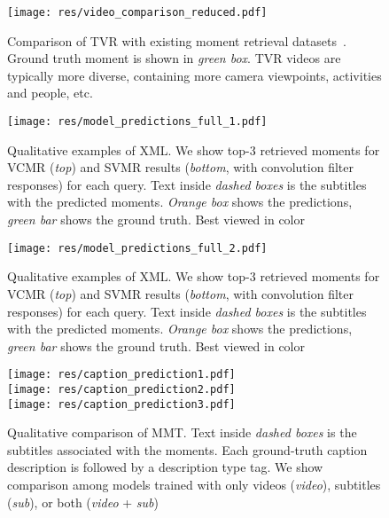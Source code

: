 \documentclass[runningheads]{llncs}
\begin{document}
\begin{figure}[!t]
  \centering
  \texttt{[image: res/video\_comparison\_reduced.pdf]}
  \caption{Comparison of TVR with existing moment retrieval datasets~\cite{regneri2013grounding,gao2017tall,Krishna2017DenseCaptioningEI,anne2017localizing}.
  Ground truth moment is shown in \textit{green box}. TVR videos are typically more diverse, containing more camera viewpoints, activities and people, etc.} 
  \label{fig:video_comparison}
\end{figure}


\begin{figure*}[!t]
  \centering
  \texttt{[image: res/model\_predictions\_full\_1.pdf]}
  \caption{Qualitative examples of XML. We show top-3 retrieved moments for VCMR (\textit{top}) and SVMR results (\textit{bottom}, with convolution filter responses) for each query. Text inside \textit{dashed boxes} is the subtitles with the predicted moments. \textit{Orange box} shows the predictions, \textit{green bar} shows the ground truth. Best viewed in color}
  \label{fig:tvr_model_predictions1}
\end{figure*}



\begin{figure*}[!t]
  \centering
  \texttt{[image: res/model\_predictions\_full\_2.pdf]}
  \caption{Qualitative examples of XML. We show top-3 retrieved moments for VCMR (\textit{top}) and SVMR results (\textit{bottom}, with convolution filter responses) for each query. Text inside \textit{dashed boxes} is the subtitles with the predicted moments. \textit{Orange box} shows the predictions, \textit{green bar} shows the ground truth. Best viewed in color}
  \label{fig:tvr_model_predictions2}
\end{figure*}


\begin{figure*}[!t]
  \centering
  \texttt{[image: res/caption\_prediction1.pdf]} \\
  \texttt{[image: res/caption\_prediction2.pdf]} \\
  \texttt{[image: res/caption\_prediction3.pdf]}
  \caption{Qualitative comparison of MMT. Text inside \textit{dashed boxes} is the subtitles associated with the moments. Each ground-truth caption description is followed by a description type tag. We show comparison among models trained with only videos (\textit{video}), subtitles (\textit{sub}), or both (\textit{video} + \textit{sub})}
  \label{fig:tvc_model_prediction}
\end{figure*}





 

\clearpage


\end{document}
